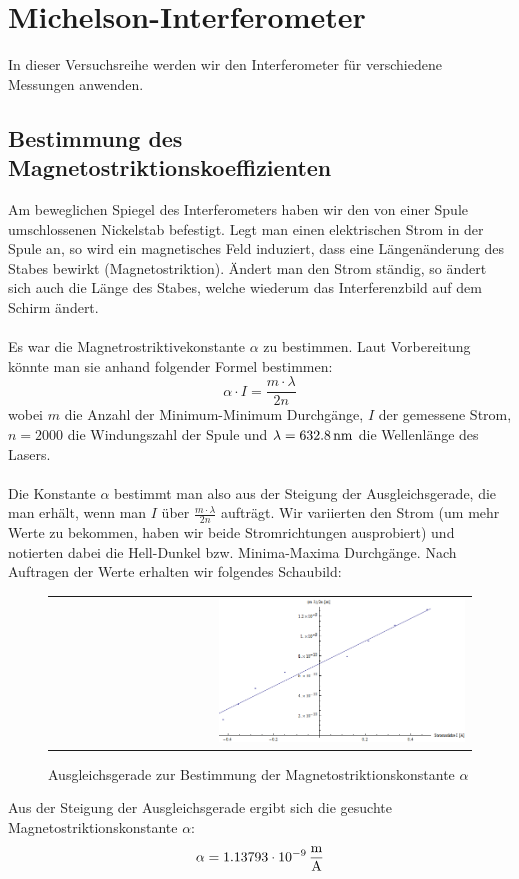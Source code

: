 \documentclass[a4paper,titlepage]{scrartcl}
\numberwithin{equation}{section}
\begin{document}
\section{Michelson-Interferometer}
In dieser Versuchsreihe werden wir den Interferometer für verschiedene Messungen anwenden.
\subsection{Bestimmung des Magnetostriktionskoeffizienten}
Am beweglichen Spiegel des Interferometers haben wir den von einer Spule umschlossenen Nickelstab befestigt. Legt man einen elektrischen Strom in der Spule an, so wird ein magnetisches Feld induziert, dass eine Längenänderung des Stabes bewirkt (Magnetostriktion). Ändert man den Strom ständig, so ändert sich auch die Länge des Stabes, welche wiederum das Interferenzbild auf dem Schirm ändert.\\ \\
Es war die Magnetrostriktivekonstante $\alpha$ zu bestimmen. Laut Vorbereitung könnte man sie anhand folgender Formel bestimmen:
\begin{equation}
\alpha \cdot I = \frac{m \cdot \lambda}{2 n}
\end{equation}
wobei $m$ die Anzahl der Minimum-Minimum Durchgänge, $I$ der gemessene Strom, $n=2000$ die Windungszahl der Spule und $\lambda=\unit[632.8]{nm}$ die Wellenlänge des Lasers.\\ \\
Die Konstante $\alpha$ bestimmt man also aus der Steigung der Ausgleichsgerade, die man erhält, wenn man $I$ über $\frac{m \cdot \lambda}{2n}$ aufträgt.
Wir variierten den Strom (um mehr Werte zu bekommen, haben wir beide Stromrichtungen ausprobiert) und notierten dabei die Hell-Dunkel bzw. Minima-Maxima Durchgänge. Nach Auftragen der Werte erhalten wir folgendes Schaubild:
\begin{figure}[H]
	\centering
	\begin{tabular}{@{}r@{}}
		\includegraphics[width=0.6\textwidth]{bilder/aufgabe21.png}\\
	\end{tabular}
	\caption{Ausgleichsgerade zur Bestimmung der Magnetostriktionskonstante $\alpha$}
	\label{fig:aufgabe21}
\end{figure}
Aus der Steigung der Ausgleichsgerade ergibt sich die gesuchte Magnetostriktionskonstante $\alpha$:
\begin{equation*}
\alpha=\unit[1.13793 \cdot 10^{-9}]{\frac{m}{A}}
\end{equation*}
\end{document}
